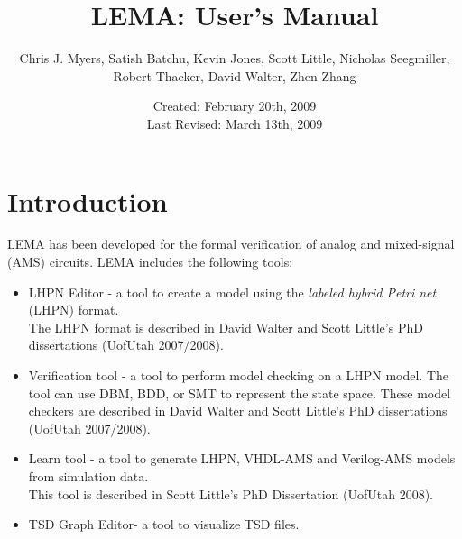 \documentclass[titlepage,11pt]{article}
\title{LEMA: User's Manual}
\author{Chris J. Myers, Satish Batchu, Kevin Jones, Scott Little, Nicholas Seegmiller, Robert Thacker, David Walter, Zhen Zhang}
\date{Created: February 20th, 2009\\
  Last Revised: March 13th, 2009
}
\begin{document}
\maketitle

  
\tableofcontents

\clearpage
  

\section{Introduction}

\noindent
LEMA has been developed for the formal verification of analog and mixed-signal (AMS) circuits.  LEMA includes the following tools: 

\begin{itemize}
\item LHPN Editor - a tool to create a model using the 
\emph{labeled hybrid Petri net} (LHPN) format.\\ 
The LHPN format is described in
David Walter and Scott Little's PhD dissertations
(UofUtah 2007/2008).
\item Verification tool - a tool to perform model checking on a LHPN model.  The tool can use DBM, BDD, or SMT to represent the state space.
These model checkers are described in
David Walter and Scott Little's PhD dissertations
(UofUtah 2007/2008).
\item Learn tool - a tool to generate LHPN, VHDL-AMS and Verilog-AMS models from simulation data.\\
This tool is described in 
Scott Little's PhD Dissertation
(UofUtah 2008).
\item TSD Graph Editor- a tool to visualize TSD files. 
\end{itemize}
\end{document}
